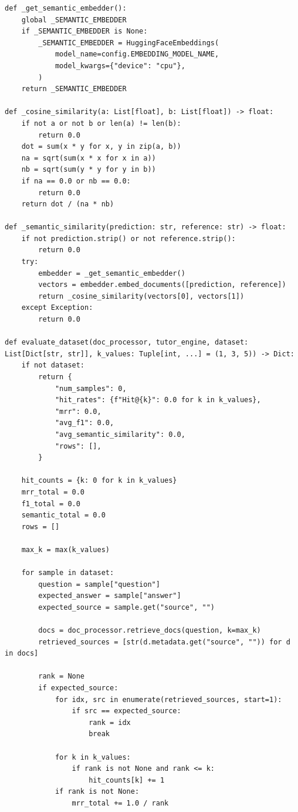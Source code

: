 \documentclass[12pt,a4paper]{article}
\begin{document}
\begin{lstlisting}[caption={evaluation.py}]
def _get_semantic_embedder():
    global _SEMANTIC_EMBEDDER
    if _SEMANTIC_EMBEDDER is None:
        _SEMANTIC_EMBEDDER = HuggingFaceEmbeddings(
            model_name=config.EMBEDDING_MODEL_NAME,
            model_kwargs={"device": "cpu"},
        )
    return _SEMANTIC_EMBEDDER

def _cosine_similarity(a: List[float], b: List[float]) -> float:
    if not a or not b or len(a) != len(b):
        return 0.0
    dot = sum(x * y for x, y in zip(a, b))
    na = sqrt(sum(x * x for x in a))
    nb = sqrt(sum(y * y for y in b))
    if na == 0.0 or nb == 0.0:
        return 0.0
    return dot / (na * nb)

def _semantic_similarity(prediction: str, reference: str) -> float:
    if not prediction.strip() or not reference.strip():
        return 0.0
    try:
        embedder = _get_semantic_embedder()
        vectors = embedder.embed_documents([prediction, reference])
        return _cosine_similarity(vectors[0], vectors[1])
    except Exception:
        return 0.0

def evaluate_dataset(doc_processor, tutor_engine, dataset: List[Dict[str, str]], k_values: Tuple[int, ...] = (1, 3, 5)) -> Dict:
    if not dataset:
        return {
            "num_samples": 0,
            "hit_rates": {f"Hit@{k}": 0.0 for k in k_values},
            "mrr": 0.0,
            "avg_f1": 0.0,
            "avg_semantic_similarity": 0.0,
            "rows": [],
        }

    hit_counts = {k: 0 for k in k_values}
    mrr_total = 0.0
    f1_total = 0.0
    semantic_total = 0.0
    rows = []

    max_k = max(k_values)

    for sample in dataset:
        question = sample["question"]
        expected_answer = sample["answer"]
        expected_source = sample.get("source", "")

        docs = doc_processor.retrieve_docs(question, k=max_k)
        retrieved_sources = [str(d.metadata.get("source", "")) for d in docs]

        rank = None
        if expected_source:
            for idx, src in enumerate(retrieved_sources, start=1):
                if src == expected_source:
                    rank = idx
                    break

            for k in k_values:
                if rank is not None and rank <= k:
                    hit_counts[k] += 1
            if rank is not None:
                mrr_total += 1.0 / rank


\end{lstlisting}
\end{document}
